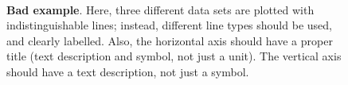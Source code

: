 \documentclass[11pt,a4paper]{article}
\begin{document}
\begin{figure}
  \centering
   \\
  \caption{\small \textbf{Bad example}.  Here, three different data
    sets are plotted with indistinguishable lines; instead, different
    line types should be used, and clearly labelled.  Also, the
    horizontal axis should have a proper title (text description and
    symbol, not just a unit).  The vertical axis should have a text
    description, not just a symbol.  }
\end{figure}
\end{document}

